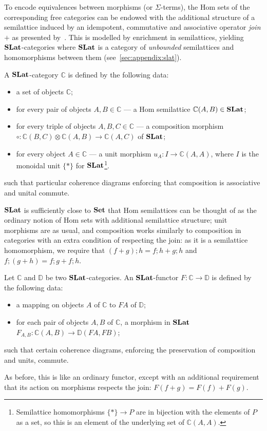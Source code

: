 To encode equivalences between morphisms (or $\Sigma$-terms), the Hom sets of the corresponding free categories can be endowed with the additional structure of a semilattice induced by an idempotent, commutative and associative operator \textit{join} $+$ as presented by~\citet{tiurin2025equivalencehypergraphsdporewriting}.
This is modelled by enrichment in semilattices, yielding $\mathbf{SLat}$-categories where $\mathbf{SLat}$ is a category of \textit{unbounded} semilattices and homomorphisms between them (see~\autoref{sec:appendix:slat}).

\begin{definition}%
	\label{def:slat-cat}
	A $\mathbf{SLat}$-category $\mathbb{C}$ is defined by the following data:
	\begin{itemize}
		\item a set of objects $\mathbb{C}$;
		\item for every pair of objects $A,B \in \mathbb{C}$ --- a Hom semilattice $\mathbb{C}(A,B) \in \mathbf{SLat}$;
		\item for every triple of objects $A,B,C \in \mathbb{C}$ --- a composition morphism
		      $\circ\colon \mathbb{C}(B,C) \otimes \mathbb{C}(A,B) \to \mathbb{C}(A,C)$ of $\mathbf{SLat}$;
		\item for every object $A \in \mathbb{C}$ --- a unit morphism
		      $u_{A}\colon I \to \mathbb{C}(A,A)$, where $I$ is the monoidal unit $\{*\}$ for $\mathbf{SLat}$\footnote{Semilattice homomorphisms $\{*\} \to P$ are in bijection with the elements of $P$ as a set, so this is an element of the underlying set of $\mathbb{C}(A,A)$.}.
	\end{itemize}
	such that particular coherence diagrams enforcing that composition is associative and unital commute.
\end{definition}
$\mathbf{SLat}$ is sufficiently close to $\mathbf{Set}$ that Hom semilattices can be thought of as the ordinary notion of Hom sets with additional semilattice structure; unit morphisms are as usual, and composition works similarly to composition in categories with an extra condition of respecting the join: as it is a semilattice homomorphism, we require that $(f + g); h = f;h + g;h$ and $f;(g+h) = f;g + f;h$.

\begin{definition}
	Let $\mathbb{C}$ and $\mathbb{D}$ be two $\mathbf{SLat}$-categories.
	An $\mathbf{SLat}$-functor $F\colon \mathbb{C} \to \mathbb{D}$ is defined by the following data:
	\begin{itemize}
		\item a mapping on objects $A$ of $\mathbb{C}$ to $F A$ of $\mathbb{D}$;
		\item for each pair of objects $A, B$ of $\mathbb{C}$, a morphism in $\mathbf{SLat}$ $F_{A,B}\colon \mathbb{C}(A,B) \to \mathbb{D}(FA,FB)$;
	\end{itemize}
	such that certain coherence diagrams, enforcing the preservation of composition and units, commute.
\end{definition}
As before, this is like an ordinary functor, except with an additional requirement that its action on morphisms respects the join: $F(f + g) = F(f) + F(g)$.

